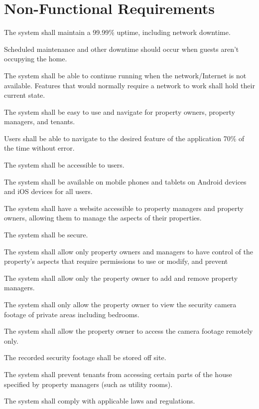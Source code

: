 \documentclass[letter,titlepage,oneside,english]{report}
\begin{document}
\section*{Non-Functional Requirements}
\begin{nfr}
\item
  The system shall maintain a 99.99\% uptime, including network downtime.
  \begin{nfr}
  \item
    Scheduled maintenance and other downtime should occur when guests aren't occupying the home.
  \end{nfr}
\item
  The system shall be able to continue running when the network/Internet is not available. Features that would normally require a network to work shall hold their current state.
\item
  The system shall be easy to use and navigate for property owners, property managers, and tenants.
  \begin{nfr}
  \item
    Users shall be able to navigate to the desired feature of the application 70\% of the time without error.
  \end{nfr}
\item
  The system shall be accessible to users.
  \begin{nfr}
  \item
    The system shall be available on mobile phones and tablets on Android devices and iOS devices for all users.
  \item
    The system shall have a website accessible to property managers and property owners, allowing them to manage the aspects of their properties.
  \end{nfr}
\item
  The system shall be secure.
  \begin{nfr}
  \item
    The system shall allow only property owners and managers to have control of the property's aspects that require permissions to use or modify, and prevent
  \item
    The system shall allow only the property owner to add and remove property managers.
  \item
    The system shall only allow the property owner to view the security camera footage of private areas including bedrooms.
    \begin{nfr}
    \item
      The system shall allow the property owner to access the camera footage remotely only.

    \item
      The recorded security footage shall be stored off site.
    \end{nfr}
  \item
    The system shall prevent tenants from accessing certain parts of the house specified by property managers (such as utility rooms).
  \end{nfr}
\item
  The system shall comply with applicable laws and regulations.
\end{nfr}
\end{document}
